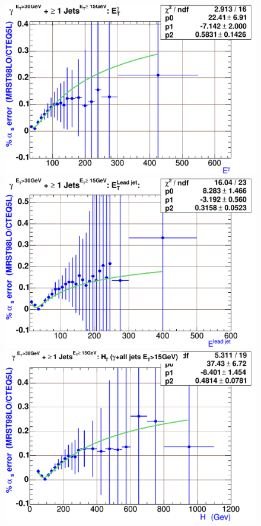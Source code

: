 \begin{figure}[h!]
 \centering
 \includegraphics[scale=0.36,keepaspectratio=true]{AlphaSsyst_pj1_Et_pho.pdf}\hspace{2ex}
 \includegraphics[scale=0.36,keepaspectratio=true]{AlphaSsyst_pj1_Et_leadjet.pdf}\\[2ex]
 \includegraphics[scale=0.36,keepaspectratio=true]{AlphaSsyst_pj1_Ht.pdf}\hspace{2ex}

\end{figure}
